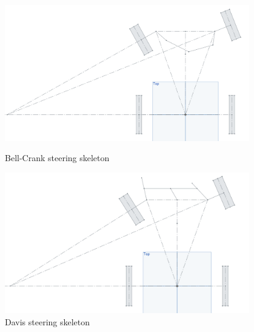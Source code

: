 \begin{figure}[ht]
\centering
\begin{minipage}[b]{.48\textwidth}
  \centering
  \includegraphics[width=0.95\textwidth]{Meetings/October/10-06-22/10-06-22_CAD_Figure3.PNG}
  \caption{Bell-Crank steering skeleton}
  \label{fig:pic1}
\end{minipage}%
\hfill%
\begin{minipage}[b]{.48\textwidth}
  \centering
  \includegraphics[width=0.95\textwidth]{Meetings/October/10-06-22/10-06-22_CAD_Figure4.PNG}
  \caption{Davis steering skeleton}
  \label{fig:pic2}
\end{minipage}
\end{figure}



